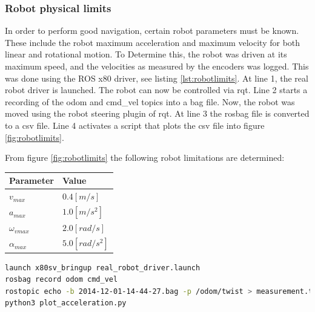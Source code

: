 \documentclass[a4paper]{article}
\begin{document}
\subsubsection{Robot physical limits}
In order to perform good navigation, certain robot parameters must be known. These include the
robot maximum acceleration and maximum velocity for both linear and rotational motion. To
Determine this, the robot was driven at its maximum speed, and the velocities as measured by
the encoders was logged. This was done using the ROS x80 driver, see listing \ref{lst:robotlimits}.
At line 1, the real robot driver is launched. The robot can now be controlled via rqt.
Line 2 starts a recording of the odom and cmd\_vel topics into a bag file. Now, the robot
was moved using the robot steering plugin of rqt. At line 3 the rosbag file is converted to
a csv file. Line 4 activates a script that plots the csv file into figure \ref{fig:robotlimits}.

From figure \ref{fig:robotlimits} the following robot limitations are determined:

\begin{tabular}{ | l | l | }
  \hline                       
  Parameter & Value \\
  \hline                       
  \hline                       
  $v_{max}$ & $0.4 [m/s] $ \\
  \hline                       
  $a_{max}$ & $ 1.0 [m/s^2] $\\
  \hline                       
  $\omega_{vmax}$ & $ 2.0 [rad/s] $ \\
  \hline                       
  $\alpha_{max}$ & $ 5.0 [rad/s^2] $ \\
  \hline  
\end{tabular}

\begin{lstlisting}[language=bash,caption={commands to determine robot limitations},
    label=lst:robotlimits]
launch x80sv_bringup real_robot_driver.launch
rosbag record odom cmd_vel
rostopic echo -b 2014-12-01-14-44-27.bag -p /odom/twist > measurement.txt
python3 plot_acceleration.py
\end{lstlisting}
\end{document}
